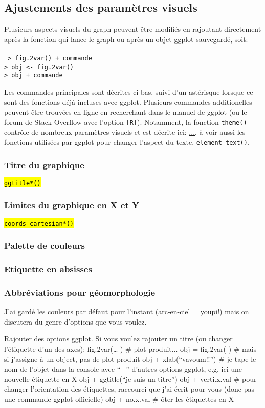 \documentclass[12pt]{article}
\begin{document}
\subsection{Ajustements des paramètres visuels}
Plusieurs aspects visuels du graph peuvent être modifiés en rajoutant  directement après la fonction qui lance le graph ou après un objet ggplot sauvegardé, soit: \\
\\
\texttt{
> fig.2var() + commande\\
> obj <- fig.2var()\\
> obj + commande\\
}

Les commandes principales sont décrites ci-bas, suivi d'un astérisque lorsque ce sont des fonctions déjà incluses avec ggplot.
Plusieurs commandes additionelles peuvent être trouvées en ligne en recherchant dans le manuel de ggplot (ou le forum de Stack Overflow avec l'option \texttt{[R]}). Notamment, la fonction \texttt{theme()} contrôle de nombreux paramètres visuels et est décrite ici: \url{...}, à voir aussi les fonctions utilisées par ggplot pour changer l'aspect du texte, \texttt{element\_text()}.

\subsubsection{Titre du graphique} \texttt{\hl{ggtitle*()}}
\subsubsection{Limites du graphique en X et Y} \texttt{\hl{coords\_cartesian*()}}
\subsubsection{Palette de couleurs}
\subsubsection{Etiquette en absisses}
\subsubsection{Abbréviations pour géomorphologie}


J’ai gardé les couleurs par défaut pour l’instant (arc-en-ciel =  youpi!) mais on discutera du genre d’options que vous voulez.

Rajouter des options ggplot. Si vous voulez rajouter un titre (ou changer l’étiquette d’un des axes):
fig.2var(… )  \# plot produit...
obj = fig.2var( ) \# mais si j’assigne à un object, pas de plot produit
obj + xlab(“vavoum!!”) \# je tape le nom de l’objet dans la console avec “+” d’autres options ggplot, e.g. ici une nouvelle étiquette en X
obj + ggtitle(“je suis un titre”)
obj + verti.x.val \# pour changer l’orientation des étiquettes, raccourci que j’ai écrit pour vous (donc pas une commande ggplot officielle)
obj + no.x.val \# ôter les étiquettes en X
\end{document}
